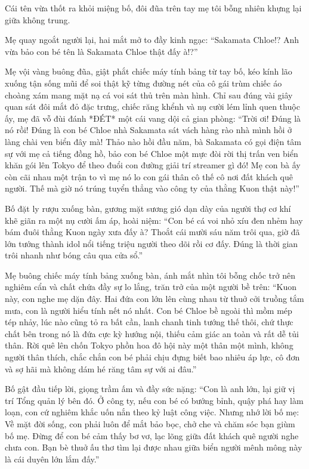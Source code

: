\documentclass[../main.tex]{subfiles}
\begin{document}
Cái tên vừa thốt ra khỏi miệng bố, đôi đũa trên tay mẹ tôi bỗng nhiên khựng lại giữa không trung.

Mẹ quay ngoắt người lại, hai mắt mở to đầy kinh ngạc: ``Sakamata Chloe!? Anh vừa bảo con bé tên là Sakamata Chloe thật đấy à!?''

Mẹ vội vàng buông đũa, giật phắt chiếc máy tính bảng từ tay bố, kéo kính lão xuống tận sống mũi để soi thật kỹ từng đường nét của cô gái trùm chiếc áo choàng xám mang mặt nạ cá voi sát thủ trên màn hình. Chỉ sau đúng vài giây quan sát đôi mắt đỏ đặc trưng, chiếc răng khểnh và nụ cười lém lỉnh quen thuộc ấy, mẹ đã vỗ đùi đánh *ĐÉT* một cái vang dội cả gian phòng: ``Trời ơi! Đúng là nó rồi! Đúng là con bé Chloe nhà Sakamata sát vách hàng rào nhà mình hồi ở làng chài ven biển đây mà! Thảo nào hồi đầu năm, bà Sakamata có gọi điện tâm sự với mẹ cả tiếng đồng hồ, bảo con bé Chloe một mực đòi rời thị trấn ven biển khăn gói lên Tokyo để theo đuổi con đường giải trí streamer gì đó! Mẹ con bà ấy còn cãi nhau một trận to vì mẹ nó lo con gái thân cô thế cô nơi đất khách quê người. Thế mà giờ nó trúng tuyển thẳng vào công ty của thằng Kuon thật này!''

Bố đặt ly rượu xuống bàn, gương mặt sương gió dạn dày của người thợ cơ khí khẽ giãn ra một nụ cười ấm áp, hoài niệm: ``Con bé cá voi nhỏ xíu đen nhẻm hay bám đuôi thằng Kuon ngày xưa đấy à? Thoắt cái mười sáu năm trôi qua, giờ đã lớn tướng thành idol nổi tiếng triệu người theo dõi rồi cơ đấy. Đúng là thời gian trôi nhanh như bóng câu qua cửa sổ.''

Mẹ buông chiếc máy tính bảng xuống bàn, ánh mắt nhìn tôi bỗng chốc trở nên nghiêm cẩn và chất chứa đầy sự lo lắng, trăn trở của một người bề trên: ``Kuon này, con nghe mẹ dặn đây. Hai đứa con lớn lên cùng nhau từ thuở cởi truồng tắm mưa, con là người hiểu tính nết nó nhất. Con bé Chloe bề ngoài thì mồm mép tép nhảy, lúc nào cũng tỏ ra bất cần, lanh chanh tinh tướng thế thôi, chứ thực chất bên trong nó là đứa cực kỳ hướng nội, thiếu cảm giác an toàn và rất dễ tủi thân. Rời quê lên chốn Tokyo phồn hoa đô hội này một thân một mình, không người thân thích, chắc chắn con bé phải chịu đựng biết bao nhiêu áp lực, cô đơn và sợ hãi mà không dám hé răng tâm sự với ai đâu.''

Bố gật đầu tiếp lời, giọng trầm ấm và đầy sức nặng: ``Con là anh lớn, lại giữ vị trí Tổng quản lý bên đó. Ở công ty, nếu con bé có bướng bỉnh, quậy phá hay làm loạn, con cứ nghiêm khắc uốn nắn theo kỷ luật công việc. Nhưng nhớ lời bố mẹ: Về mặt đời sống, con phải luôn để mắt bảo bọc, chở che và chăm sóc bạn giùm bố mẹ. Đừng để con bé cảm thấy bơ vơ, lạc lõng giữa đất khách quê người nghe chưa con. Bạn bè thuở ấu thơ tìm lại được nhau giữa biển người mênh mông này là cái duyên lớn lắm đấy.''
\end{document}
